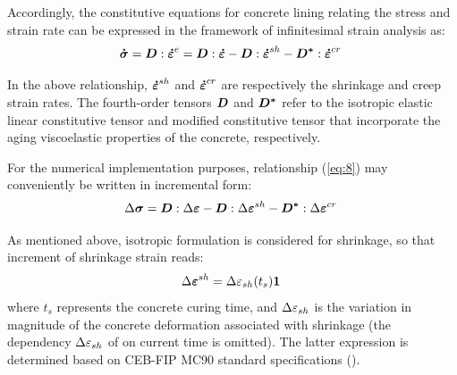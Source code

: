 \documentclass[Journal,letterpaper, NoLists,SectionNumbers]{ascelike-new}
\begin{document}
Accordingly, the constitutive equations for concrete lining relating the stress and strain rate can be expressed in the framework of infinitesimal strain analysis as:
\begin{equation} \label{eq:8}
	\boldsymbol{\dot{\sigma}} = \boldsymbol{D} : \boldsymbol{\dot{\varepsilon}}^{e} = \boldsymbol{D} : \boldsymbol{\dot{\varepsilon}} - \boldsymbol{D} : \boldsymbol{\dot{\varepsilon}}^{sh} - \boldsymbol{D^{*}} : \boldsymbol{\dot{\varepsilon}}^{cr}\;
\end{equation}

In the above relationship, $\boldsymbol{\dot{\varepsilon}}^{sh}$  and $\boldsymbol{\dot{\varepsilon}}^{cr}$ are respectively the shrinkage and creep strain rates. The fourth-order tensors $\boldsymbol{D}$ and $\boldsymbol{D^{*}}$ refer to the isotropic elastic linear constitutive tensor and modified constitutive tensor that incorporate the aging viscoelastic properties of the concrete, respectively.

For the numerical implementation purposes, relationship (\ref{eq:8}) may conveniently be written in incremental form: 
\begin{equation} \label{eq:9}
	\Delta \boldsymbol{\sigma} = \boldsymbol{D} : \Delta \boldsymbol{\varepsilon} - \boldsymbol{D} : \Delta \boldsymbol{\varepsilon}^{sh} - \boldsymbol{D^{*}} : \Delta \boldsymbol{\varepsilon}^{cr} \;
\end{equation}

As mentioned above, isotropic formulation is considered for shrinkage, so that increment of shrinkage strain reads:
\begin{equation} \label{eq:10}
	\Delta \boldsymbol{\varepsilon}^{sh} =  \Delta \varepsilon_{sh}(t_{s}) \boldsymbol{1} \;
\end{equation}
where $t_{s}$ represents the concrete curing time, and $\Delta \varepsilon_{sh}$ is the variation in magnitude of the concrete deformation associated with shrinkage (the dependency $\Delta \varepsilon_{sh}$ of on current time is omitted). The latter expression is determined based on CEB-FIP MC90 standard specifications (). 
\end{document}
